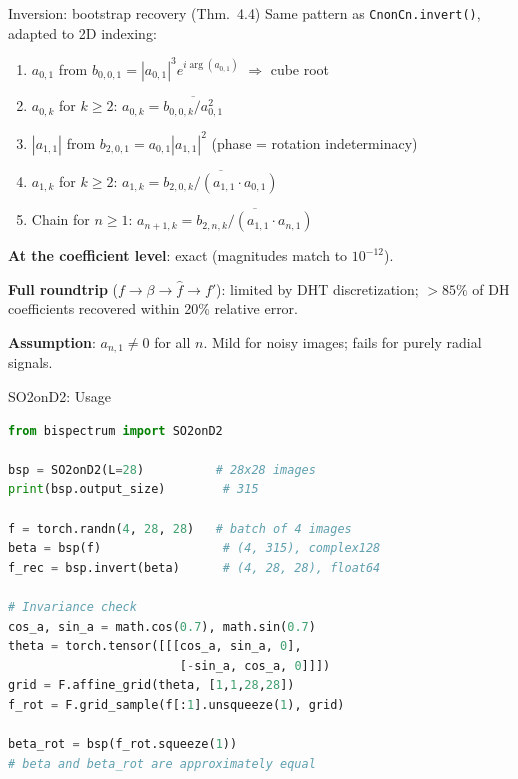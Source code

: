\documentclass[aspectratio=169]{beamer}
\begin{document}
\begin{frame}{Inversion: bootstrap recovery (Thm.~4.4)}
  Same pattern as \texttt{CnonCn.invert()}, adapted to 2D indexing:

  \medskip

  \begin{enumerate}\setlength{\itemsep}{1pt}
    \item $a_{0,1}$ from $b_{0,0,1} = |a_{0,1}|^3 e^{i\arg(a_{0,1})}$ \quad $\Rightarrow$ \quad cube root
    \item $a_{0,k}$ for $k \geq 2$: \quad $a_{0,k} = \overline{b_{0,0,k} / a_{0,1}^2}$
    \item $|a_{1,1}|$ from $b_{2,0,1} = a_{0,1} |a_{1,1}|^2$ \quad (phase = rotation indeterminacy)
    \item $a_{1,k}$ for $k \geq 2$: \quad $a_{1,k} = \overline{b_{2,0,k} / (a_{1,1} \cdot a_{0,1})}$
    \item Chain for $n \geq 1$: \quad $a_{n+1,k} = \overline{b_{2,n,k} / (a_{1,1} \cdot a_{n,1})}$
  \end{enumerate}

  \medskip

  \textbf{At the coefficient level}: exact (magnitudes match to $10^{-12}$).

  \textbf{Full roundtrip} ($f \to \beta \to \hat{f} \to f'$): limited by DHT discretization;
  ${>}85\%$ of DH coefficients recovered within 20\% relative error.

  \medskip

  \textbf{Assumption}: $a_{n,1} \neq 0$ for all $n$.
  Mild for noisy images; fails for purely radial signals.
\end{frame}

\begin{frame}[fragile]{SO2onD2: Usage}
\begin{lstlisting}[language=Python]
from bispectrum import SO2onD2

bsp = SO2onD2(L=28)          # 28x28 images
print(bsp.output_size)        # 315

f = torch.randn(4, 28, 28)   # batch of 4 images
beta = bsp(f)                 # (4, 315), complex128
f_rec = bsp.invert(beta)      # (4, 28, 28), float64

# Invariance check
cos_a, sin_a = math.cos(0.7), math.sin(0.7)
theta = torch.tensor([[[cos_a, sin_a, 0],
                        [-sin_a, cos_a, 0]]])
grid = F.affine_grid(theta, [1,1,28,28])
f_rot = F.grid_sample(f[:1].unsqueeze(1), grid)

beta_rot = bsp(f_rot.squeeze(1))
# beta and beta_rot are approximately equal
\end{lstlisting}
\end{frame}
\end{document}
